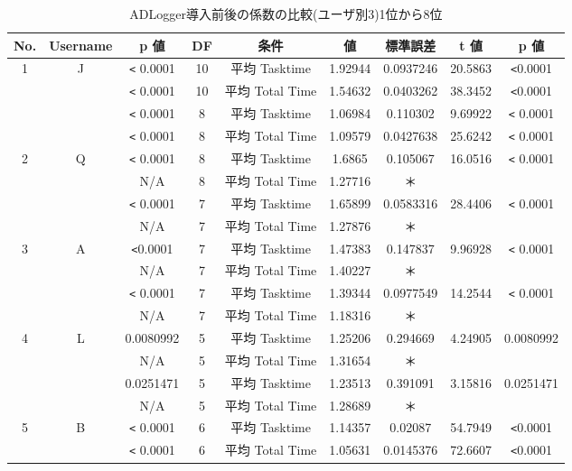 \begin{table}[ht]
\begin{center}
 \caption{ADLogger導入前後の係数の比較(ユーザ別3)1位から8位}
\begin{tabular}{|c|c|c|c|c|c|c|c|c|} \hline
No. & Username & p 値 & DF & 条件 & 値 & 標準誤差 & t 値 & p 値 \\\hline
1 & J & \verb|<| 0.0001 & 10 & 平均 Tasktime & 1.92944 & 0.0937246 & 20.5863 & \verb|<|0.0001 \\\hline
 &  & \verb|<| 0.0001 & 10 & 平均 Total Time & 1.54632 & 0.0403262 & 38.3452 & \verb|<|0.0001 \\\hline
 &  & \verb|<| 0.0001 & 8 & 平均 Tasktime & 1.06984 & 0.110302 & 9.69922 & \verb|<| 0.0001 \\\hline
 &  & \verb|<| 0.0001 & 8 & 平均 Total Time & 1.09579 & 0.0427638 & 25.6242 & \verb|<| 0.0001\\\hline
2 & Q & \verb|<| 0.0001 & 8 & 平均 Tasktime & 1.6865 & 0.105067 & 16.0516 &\verb|<| 0.0001\\\hline
 &  & N/A & 8 & 平均 Total Time & 1.27716 & ＊ &  &  \\\hline
 &  & \verb|<| 0.0001 & 7 & 平均 Tasktime & 1.65899 & 0.0583316 & 28.4406 & \verb|<| 0.0001 \\\hline
 &  & N/A & 7 & 平均 Total Time & 1.27876 & ＊ &  &  \\\hline
3 & A & \verb|<|0.0001 & 7 & 平均 Tasktime & 1.47383 & 0.147837 & 9.96928 & \verb|<| 0.0001 \\\hline
 &  & N/A & 7 & 平均 Total Time & 1.40227 & ＊ &  &  \\\hline
 &  & \verb|<| 0.0001 & 7 & 平均 Tasktime & 1.39344 & 0.0977549 & 14.2544 &\verb|<| 0.0001\\\hline
 &  & N/A & 7 & 平均 Total Time & 1.18316 & ＊ &  &  \\\hline
4 & L & 0.0080992 & 5 & 平均 Tasktime & 1.25206 & 0.294669 & 4.24905 & 0.0080992 \\\hline
 &  & N/A & 5 & 平均 Total Time & 1.31654 & ＊ &  &  \\\hline
 &  & 0.0251471 & 5 & 平均 Tasktime & 1.23513 & 0.391091 & 3.15816 & 0.0251471\\\hline
 &  & N/A & 5 & 平均 Total Time & 1.28689 & ＊ &  & \\\hline
5 & B & \verb|<| 0.0001 & 6 & 平均 Tasktime & 1.14357 & 0.02087 & 54.7949 &\verb|<|0.0001 \\\hline
 &  &\verb|<| 0.0001 & 6 & 平均 Total Time & 1.05631 & 0.0145376 & 72.6607 &\verb|<|0.0001 \\\hline

\end{tabular}
\end{center}
\end{table}
